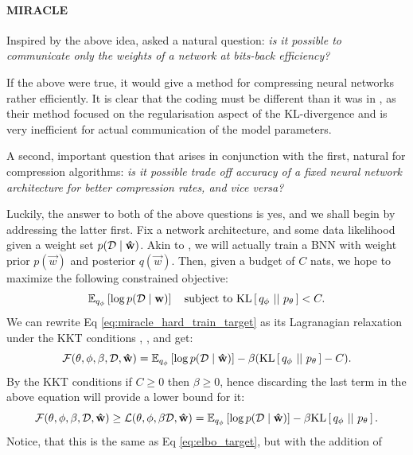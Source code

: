 \paragraph{MIRACLE}
Inspired by the above idea, \cite{havasi2018minimal} asked a natural question:
\textit{is it possible to communicate only the weights of a network at
  bits-back efficiency?}
\par
If the above were true, it would give a method for compressing neural networks
rather efficiently. It is clear that the coding must be different than it was in
\cite{hinton1993keeping}, as their method focused on the regularisation aspect
of the KL-divergence and is very inefficient for actual communication of the
model parameters.
\par
A second, important question that arises in conjunction with the first, natural
for compression algorithms:
\textit{is it possible trade off accuracy of a fixed neural network architecture
  for better compression rates, and vice versa?}
\par
Luckily, the answer to both of the above questions is yes, and we shall begin by
addressing the latter first. Fix a network architecture, and some data
likelihood given a weight set $p(\Data \mid \vec{\hat{w}})$. Akin to
\cite{hinton1993keeping}, we will actually train a BNN with weight prior
$p(\vec{w})$ and posterior $q(\vec{w})$. Then, given a budget of $C$ nats, we
hope to maximize the following constrained objective:
\begin{equation}
\label{eq:miracle_hard_train_target}
\Exp{\log p(\Data \mid \vec{w})}{q_\phi} \quad \text{subject to }
\KL{q_{\phi}}{p_{\theta}} < C.
\end{equation}
We can rewrite Eq \ref{eq:miracle_hard_train_target} as its Lagranagian
relaxation under the KKT conditions \cite{karush2014minima},
\cite{kuhn2014nonlinear}, \cite{higgins2017beta} and get:
\[
  \F(\theta, \phi, \beta, \Data, \vec{\hat{w}}) = 
  \Exp{\log p(\Data \mid \vec{\hat{w}})}{q_\phi} - \beta (\KL{q_{\phi}}{p_{\theta}} - C).
\]
By the KKT conditions if $C \geq 0$ then $\beta \geq 0$, hence discarding the last
term in the above equation will provide a lower bound for it:
\begin{equation}
\label{eq:miracle_train_target}
\F(\theta, \phi, \beta, \Data, \vec{\hat{w}}) \geq
\L(\theta, \phi, \beta \Data, \vec{\hat{w}}) =
\Exp{\log p(\Data \mid \vec{\hat{w}})}{q_\phi} - \beta \KL{q_{\phi}}{p_{\theta}}.
\end{equation}
Notice, that this is the same as Eq \ref{eq:elbo_target}, but with the addition of
